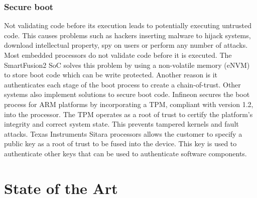 \subsubsection*{Secure boot}
Not validating code before its execution leads to potentially executing untrusted code. This causes problems such as hackers inserting malware to hijack systems, download intellectual property, spy on users or perform any number of attacks.
Most embedded processors do not validate code before it is executed. The SmartFusion2 \ac{SoC} solves this problem by using a non-volatile memory (eNVM) to store boot code which can be write protected. Another reason is it authenticates each stage of the boot process to create a chain-of-trust.
Other systems also implement solutions to secure boot code. Infineon secures the boot process for ARM platforms by incorporating a \ac{TPM}, compliant with version 1.2, into the processor. The \ac{TPM} operates as a root of trust to certify the platform's integrity and correct system state. This prevents tampered kernels and fault attacks.
Texas Instruments Sitara processors allows the customer to specify a public key as a root of trust to be fused into the device. This key is used to authenticate other keys that can be used to authenticate software components.

\section{State of the Art}\label{chap:background:art}

